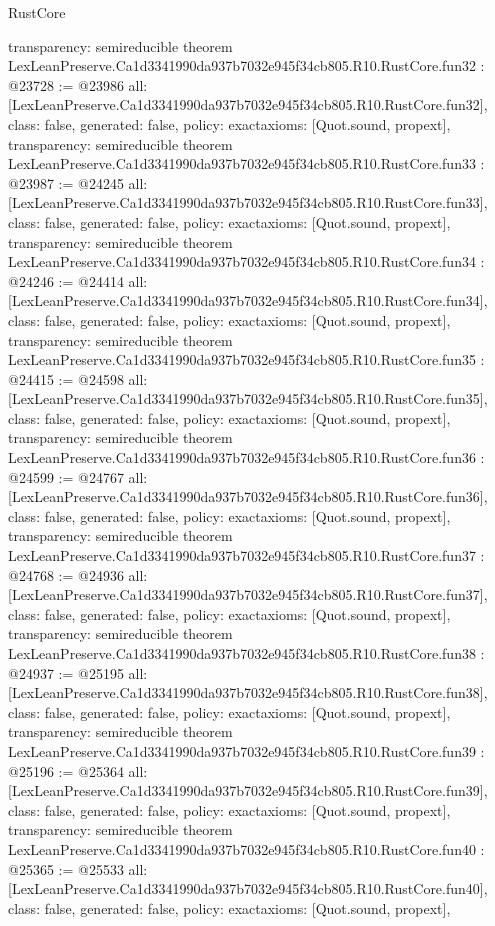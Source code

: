 \begin{lexlean}{RustCore}
\begin{coremodule}
{  transparency: semireducible
}
theorem LexLeanPreserve.Ca1d3341990da937b7032e945f34cb805.R10.RustCore.fun32 : @23728 := @23986 {
  all: [LexLeanPreserve.Ca1d3341990da937b7032e945f34cb805.R10.RustCore.fun32],
  class: false,
  generated: false,
  policy: exact{axioms: [Quot.sound, propext]},
  transparency: semireducible
}
theorem LexLeanPreserve.Ca1d3341990da937b7032e945f34cb805.R10.RustCore.fun33 : @23987 := @24245 {
  all: [LexLeanPreserve.Ca1d3341990da937b7032e945f34cb805.R10.RustCore.fun33],
  class: false,
  generated: false,
  policy: exact{axioms: [Quot.sound, propext]},
  transparency: semireducible
}
theorem LexLeanPreserve.Ca1d3341990da937b7032e945f34cb805.R10.RustCore.fun34 : @24246 := @24414 {
  all: [LexLeanPreserve.Ca1d3341990da937b7032e945f34cb805.R10.RustCore.fun34],
  class: false,
  generated: false,
  policy: exact{axioms: [Quot.sound, propext]},
  transparency: semireducible
}
theorem LexLeanPreserve.Ca1d3341990da937b7032e945f34cb805.R10.RustCore.fun35 : @24415 := @24598 {
  all: [LexLeanPreserve.Ca1d3341990da937b7032e945f34cb805.R10.RustCore.fun35],
  class: false,
  generated: false,
  policy: exact{axioms: [Quot.sound, propext]},
  transparency: semireducible
}
theorem LexLeanPreserve.Ca1d3341990da937b7032e945f34cb805.R10.RustCore.fun36 : @24599 := @24767 {
  all: [LexLeanPreserve.Ca1d3341990da937b7032e945f34cb805.R10.RustCore.fun36],
  class: false,
  generated: false,
  policy: exact{axioms: [Quot.sound, propext]},
  transparency: semireducible
}
theorem LexLeanPreserve.Ca1d3341990da937b7032e945f34cb805.R10.RustCore.fun37 : @24768 := @24936 {
  all: [LexLeanPreserve.Ca1d3341990da937b7032e945f34cb805.R10.RustCore.fun37],
  class: false,
  generated: false,
  policy: exact{axioms: [Quot.sound, propext]},
  transparency: semireducible
}
theorem LexLeanPreserve.Ca1d3341990da937b7032e945f34cb805.R10.RustCore.fun38 : @24937 := @25195 {
  all: [LexLeanPreserve.Ca1d3341990da937b7032e945f34cb805.R10.RustCore.fun38],
  class: false,
  generated: false,
  policy: exact{axioms: [Quot.sound, propext]},
  transparency: semireducible
}
theorem LexLeanPreserve.Ca1d3341990da937b7032e945f34cb805.R10.RustCore.fun39 : @25196 := @25364 {
  all: [LexLeanPreserve.Ca1d3341990da937b7032e945f34cb805.R10.RustCore.fun39],
  class: false,
  generated: false,
  policy: exact{axioms: [Quot.sound, propext]},
  transparency: semireducible
}
theorem LexLeanPreserve.Ca1d3341990da937b7032e945f34cb805.R10.RustCore.fun40 : @25365 := @25533 {
  all: [LexLeanPreserve.Ca1d3341990da937b7032e945f34cb805.R10.RustCore.fun40],
  class: false,
  generated: false,
  policy: exact{axioms: [Quot.sound, propext]},
}
\end{coremodule}
\end{lexlean}
